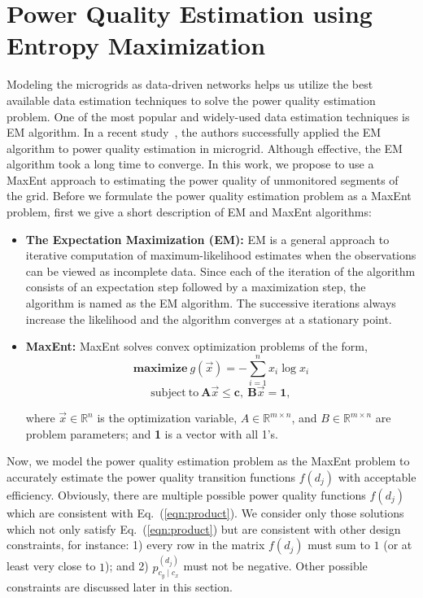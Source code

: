 \section{Power Quality Estimation using Entropy Maximization}
\label{sec:formulation}
Modeling the microgrids as data-driven networks helps us utilize the best available data estimation techniques to solve the power quality estimation problem. One of the most popular and widely-used data estimation techniques is EM algorithm. In a recent study~\cite{catherine_pri}, the authors successfully applied the EM algorithm to power quality estimation in microgrid. Although effective, the EM algorithm took a long time to converge. In this work, we propose to use a MaxEnt approach to estimating the power quality of unmonitored segments of the grid. Before we formulate the power quality estimation problem as a MaxEnt problem, first we give a short description of EM and MaxEnt algorithms:

\begin{itemize}\itemsep0.7em
\item \textbf{The Expectation Maximization (EM):} EM is a general approach to iterative computation of maximum-likelihood estimates when the observations can be viewed as incomplete data. Since each of the iteration of the algorithm consists of an expectation step followed by a maximization step, the algorithm is named as the EM algorithm. The successive iterations always increase the likelihood and the algorithm converges at a stationary point.
\item \textbf{MaxEnt:} MaxEnt solves convex optimization problems of the form,
\[\mathrm{\mathbf{maximize}}~g(\vec{x}) = - \sum_{i=1}^n x_i \log x_i \]
\[\mathrm{subject~to~} \mathbf{A}\vec{x} \leq \mathbf{c},~ \mathbf{B}\vec{x} = \mathbf{1},\]

where $\vec{x}\in \mathbb{R}^n$ is the optimization variable, $A \in \mathbb{R}^{m \times n}$, and $B \in \mathbb{R}^{m \times n}$ are problem parameters;  and \textbf{1} is a vector with all 1's.
\end{itemize}

Now, we model the power quality estimation problem as the MaxEnt problem to accurately estimate the power quality transition functions $f(d_j)$ with acceptable efficiency. Obviously, there are multiple possible power quality functions $f(d_j)$ which are consistent with Eq.~(\ref{eqn:product}). We consider only those solutions which not only satisfy Eq.~(\ref{eqn:product}) but are consistent with other design constraints, for instance: 1) every row in the matrix $f(d_j)$ must sum to $1$ (or at least very close to $1$); and 2) $p_{c_y \mid c_x}^{(d_j)}$ must not be negative. Other possible constraints are discussed later in this section.


